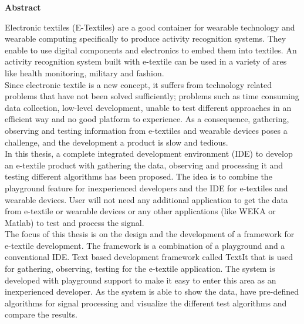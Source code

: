 

\clearemptydoublepage
{}
{}	

\vspace*{2cm}
\begin{center}
{\Large \bf Abstract}
\end{center}
\vspace{1cm}


\def\sife {Smart Environment Integration Framework}
\def\TI{TextIt}

\def\seif {Smart Environment Integration Framework}

Electronic textiles (E-Textiles) are a good container for wearable technology and wearable computing specifically to produce activity recognition systems. They enable to use digital components and electronics to embed them into textiles. An activity recognition system built with e-textile can be used in a variety of ares like health monitoring, military and fashion. \\

Since electronic textile is a new concept, it suffers from technology related problems that have not been solved sufficiently; problems such as time consuming data collection, low-level development, unable to test different approaches in an efficient way and no good platform to experience. As a consequence, gathering, observing and testing information from e-textiles and wearable devices poses a challenge, and the development a product is slow and tedious. \\

In this thesis, a complete integrated development environment (IDE) to develop an e-textile product with gathering the data, observing and processing it and testing different algorithms has been proposed. The idea is to combine the playground feature for inexperienced developers and the IDE for e-textiles and wearable devices. User will not need any additional application to get the data from e-textile or wearable devices or any other applications (like WEKA or Matlab) to test and process the signal. \\

The focus of this thesis is on the design and the development of a framework for e-textile development. The framework is a combination of a playground and a conventional IDE. Text based development framework called TextIt that is used for gathering, observing, testing for the e-textile application. The system is developed with playground support to make it easy to enter this area as an inexperienced developer. As the system is able to show the data, have pre-defined algorithms for signal processing and visualize the different test algorithms and compare the results. 



